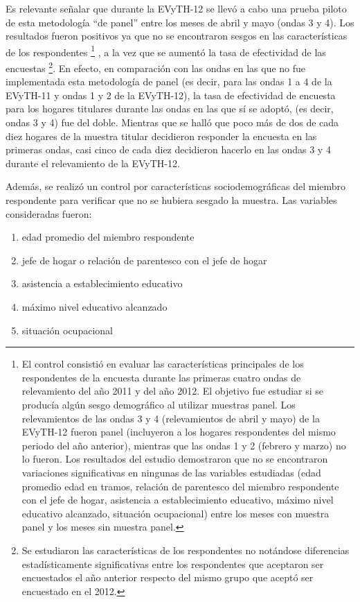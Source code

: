 \documentclass[
  openany]{book}
\begin{document}
Es relevante señalar que durante la EVyTH-12 se llevó a cabo una prueba piloto de esta metodología ``de panel'' entre los meses de abril y mayo (ondas 3 y 4). Los resultados fueron positivos ya que no se encontraron sesgos en las características de los respondentes \footnote{El control consistió en evaluar las características principales de los respondentes de la encuesta durante las primeras cuatro ondas de relevamiento del año 2011 y del año 2012. El objetivo fue estudiar si se producía algún sesgo demográfico al utilizar muestras panel. Los relevamientos de las ondas 3 y 4 (relevamientos de abril y mayo) de la EVyTH-12 fueron panel (incluyeron a los hogares respondentes del mismo periodo del año anterior), mientras que las ondas 1 y 2 (febrero y marzo) no lo fueron. Los resultados del estudio demostraron que no se encontraron variaciones significativas en ningunas de las variables estudiadas (edad promedio edad en tramos, relación de parentesco del miembro respondente con el jefe de hogar, asistencia a establecimiento educativo, máximo nivel educativo alcanzado, situación ocupacional) entre los meses con muestra panel y los meses sin muestra panel.} , a la vez que se aumentó la tasa de efectividad de las encuestas \footnote{Se estudiaron las características de los respondentes no notándose diferencias estadísticamente significativas entre los respondentes que aceptaron ser encuestados el año anterior respecto del mismo grupo que aceptó ser encuestado en el 2012.}. En efecto, en comparación con las ondas en las que no fue implementada esta metodología de panel (es decir, para las ondas 1 a 4 de la EVyTH-11 y ondas 1 y 2 de la EVyTH-12), la tasa de efectividad de encuesta para los hogares titulares durante las ondas en las que sí se adoptó, (es decir, ondas 3 y 4) fue del doble. Mientras que se halló que poco más de dos de cada diez hogares de la muestra titular decidieron responder la encuesta en las primeras ondas, casi cinco de cada diez decidieron hacerlo en las ondas 3 y 4 durante el relevamiento de la EVyTH-12.

Además, se realizó un control por características sociodemográficas del miembro respondente para verificar que no se hubiera sesgado la muestra. Las variables consideradas fueron:

\begin{enumerate}
\def\labelenumi{\arabic{enumi}.}
\item
  edad promedio del miembro respondente
\item
  jefe de hogar o relación de parentesco con el jefe de hogar
\item
  asistencia a establecimiento educativo
\item
  máximo nivel educativo alcanzado
\item
  situación ocupacional
\end{enumerate}
\end{document}
